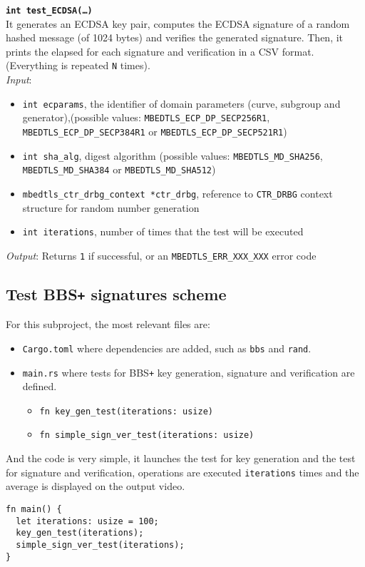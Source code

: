 \noindent
\texttt{\bfseries int test\_ECDSA(\dots)}\\
It generates an ECDSA key pair, computes the ECDSA signature of a random hashed message (of 1024 bytes) and verifies the generated signature. Then, it prints the elapsed for each signature and verification in a CSV format. (Everything is repeated \texttt{N} times). \\
\textit{Input}:
\begin{itemize}[noitemsep,nolistsep]
  \item \texttt{int ecparams}, the identifier of domain parameters (curve, subgroup and generator),(possible values: \texttt{MBEDTLS\_ECP\_DP\_SECP256R1}, \texttt{MBEDTLS\_ECP\_DP\_SECP384R1} or \texttt{MBEDTLS\_ECP\_DP\_SECP521R1})
  \item \texttt{int sha\_alg}, digest algorithm (possible values: \texttt{MBEDTLS\_MD\_SHA256}, \texttt{MBEDTLS\_MD\_SHA384} or \texttt{MBEDTLS\_MD\_SHA512})
  \item \texttt{mbedtls\_ctr\_drbg\_context *ctr\_drbg}, reference to \texttt{CTR\_DRBG} context structure for random number generation
  \item \texttt{int iterations}, number of times that the test will be executed
\end{itemize}
\textit{Output}:  Returns \texttt{1} if successful, or an \texttt{MBEDTLS\_ERR\_XXX\_XXX} error code


\subsection{Test BBS\texttt{+} signatures scheme}
For this subproject, the most relevant files are:
\begin{itemize}
  \item \texttt{Cargo.toml} where dependencies are added, such as  
  \texttt{bbs} and \texttt{rand}. 
  \item \texttt{main.rs} where tests for BBS\texttt{+} key generation, signature and verification are defined. 
  \begin{itemize} 
    \item \texttt{fn key\_gen\_test(iterations: usize)}
    \item \texttt{fn simple\_sign\_ver\_test(iterations: usize)}
  \end{itemize}
\end{itemize}
And the code is very simple, it launches the test for key generation and the test for signature and verification, operations are executed \texttt{iterations} times and the average is displayed on the output video.  \\
\begin{lstlisting}[frame=single]
fn main() {
  let iterations: usize = 100;
  key_gen_test(iterations);
  simple_sign_ver_test(iterations);
}
\end{lstlisting}


